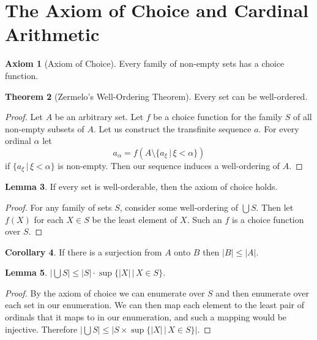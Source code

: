 \documentclass{article}
\theoremstyle{definition}
\newtheorem{thm}{Theorem}[section]
\newtheorem{crly}[thm]{Corollary}
\newtheorem{axm}[thm]{Axiom}
\newtheorem{lmma}[thm]{Lemma}
\newcommand{\abs}[1]{\lvert#1\rvert}
\begin{document}
\newpage

\section{The Axiom of Choice and Cardinal Arithmetic}

\begin{axm}[Axiom of Choice]
    Every family of non-empty sets has a choice function.
\end{axm}

\begin{thm}[Zermelo's Well-Ordering Theorem]
    Every set can be well-ordered.
\end{thm}

\begin{proof}
    Let $A$ be an arbitrary set. Let $f$ be a choice function for the family $S$ of all non-empty subsets of $A$. Let us construct the transfinite sequence $a$. For every ordinal $\alpha$ let
    \[
        a_\alpha = f(A \setminus \{a_\xi \, | \, \xi < \alpha\})    
    \] 
    if $\{a_\xi \, | \, \xi < \alpha\}$ is non-empty. Then our sequence induces a well-ordering of $A$.
\end{proof}

\begin{lmma}
    If every set is well-orderable, then the axiom of choice holds.
\end{lmma}

\begin{proof}
    For any family of sets $S$, consider some  well-ordering of $\bigcup S$. Then let $f(X)$ for each $X \in S$ be the least element of $X$. Such an $f$ is a choice function over $S$.
\end{proof}

\begin{crly}
    If there is a surjection from $A$ onto $B$ then $\abs{B} \le \abs{A}$.
\end{crly}

\begin{lmma}
    $\abs{\bigcup S} \le \abs{S} \cdot \sup\{\abs{X} \, | \, X \in S\}$.
\end{lmma}

\begin{proof}
    By the axiom of choice we can enumerate over $S$ and then enumerate over each set in our enumeration. We can then map each element to the least pair of ordinals that it maps to in our enumeration, and such a mapping would be injective. Therefore $\abs{\bigcup S} \le \abs{S \times \sup\{\abs{X} \, | \, X \in S\}}$.
\end{proof}
\end{document}
